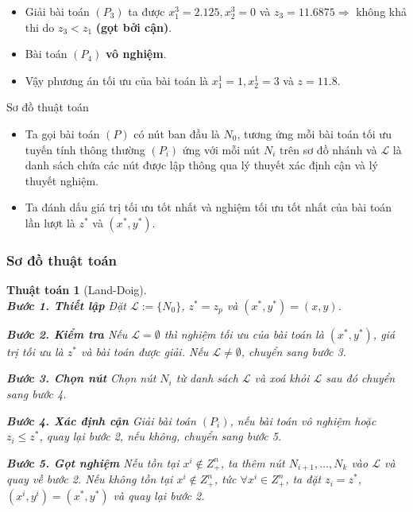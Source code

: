 \documentclass[12pt,a4paper]{report}
\newtheorem{ttoan}{Thuật toán}
\begin{document}
    \begin{itemize} 
    \item Giải bài toán $(P_3)$ ta được $x^3_1=2.125, x^3_2=0$ và $z_3=11.6875 \Rightarrow $ không khả thi do $z_3 < z_1$ \textbf{(gọt bởi cận)}. 
    \item Bài toán $(P_4)$ \textbf{vô nghiệm}.
    \item Vậy phương án tối ưu của bài toán là $x^1_1=1, x^1_2=3$ và $z=11.8$.
\end{itemize}


{Sơ đồ thuật toán}
\begin{itemize}
\item Ta gọi bài toán $(P)$ có nút ban đầu là $N_0$, tương ứng mỗi bài toán tối ưu tuyến tính thông thường $(P_i)$ ứng với mỗi nút $N_i$ trên sơ đồ nhánh và $\mathcal{L}$ là danh sách chứa các nút được lập thông qua lý thuyết xác định cận và lý thuyết nghiệm.
\item Ta đánh dấu giá trị tối ưu tốt nhất và nghiệm tối ưu tốt nhất của bài toán lần lượt là $z^*$ và $(x^*,y^*)$.
\end{itemize}

\subsubsection*{Sơ đồ thuật toán}
\begin{ttoan}[Land-Doig]
\setlength{\parindent}{4em}
\noindent \\
\noindent \textbf{Bước 1. Thiết lập}
Đặt $\mathcal{L}:=\{N_0 \}$, $z^*=z_p$ và $(x^*,y^*)=(x,y)$. 

\noindent \textbf{Bước 2. Kiểm tra} 
Nếu $\mathcal{L} = \emptyset$ thì nghiệm tối ưu của bài toán là $(x^*,y^*)$, giá trị  tối ưu là $z^*$ và bài toán được giải. 
Nếu $\mathcal{L} \neq \emptyset$, chuyển sang bước 3.

\noindent \textbf{Bước 3. Chọn nút} 
Chọn nút $N_i$ từ danh sách $\mathcal{L}$ và xoá khỏi $\mathcal{L}$ sau đó chuyển sang  bước 4. 

\noindent \textbf{Bước 4. Xác định cận}  
Giải bài toán $(P_i)$, nếu bài toán vô nghiệm hoặc $z_i \leq z^*$, quay  lại bước 2, nếu không, chuyển sang bước 5.

\noindent \textbf{Bước 5. Gọt nghiệm} 
Nếu tồn tại $x^i \notin Z^n_+$, ta thêm nút $N_{i+1}, \ldots , N_{k}$ vào $\mathcal{L}$ và quay  về bước 2. 
Nếu không tồn tại $x^i \notin Z^n_+$, tức $\forall x^i \in Z^n_+$, ta đặt $z_i = z^*$,  $(x^i,y^i) = (x^*,y^*)$ và quay lại bước 2.
\end{ttoan}
\end{document}
